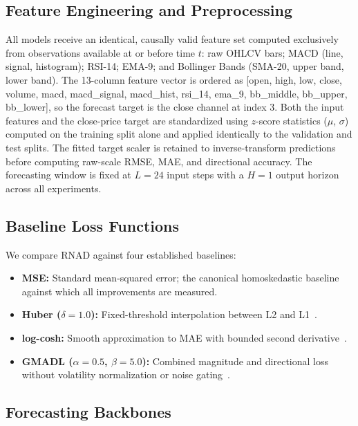 \documentclass[11pt]{article}
\newcommand{\RNAD}{RNAD\xspace}
\begin{document}
\FloatBarrier

\subsection{Feature Engineering and Preprocessing}

All models receive an identical, causally valid feature set computed
exclusively from observations available at or before time $t$:
raw OHLCV bars; MACD (line, signal, histogram); RSI-14; EMA-9; and
Bollinger Bands (SMA-20, upper band, lower band). The 13-column
feature vector is ordered as [open, high, low, close, volume, macd,
macd\_signal, macd\_hist, rsi\_14, ema\_9, bb\_middle, bb\_upper,
bb\_lower], so the forecast target is the close channel at index 3.
Both the input features and the close-price target are standardized
using $z$-score statistics ($\mu$, $\sigma$) computed on the training
split alone and applied identically to the validation and test splits.
The fitted target scaler is retained to inverse-transform predictions
before computing raw-scale RMSE, MAE, and directional accuracy. The
forecasting window is fixed at $L = 24$ input steps with a $H = 1$
output horizon across all experiments.

\subsection{Baseline Loss Functions}

We compare \RNAD against four established baselines:
\begin{itemize}
\item \textbf{MSE:} Standard mean-squared error; the canonical
  homoskedastic baseline against which all improvements are measured.
\item \textbf{Huber ($\delta = 1.0$):} Fixed-threshold interpolation
  between L2 and L1~\citep{huber1964robust}.
\item \textbf{log-cosh:} Smooth approximation to MAE with bounded
  second derivative~\citep{saleh2024logcosh}.
\item \textbf{GMADL ($\alpha = 0.5$, $\beta = 5.0$):} Combined
  magnitude and directional loss without volatility normalization
  or noise gating~\citep{michankow2024gmadl}.
\end{itemize}

\subsection{Forecasting Backbones}
\end{document}
